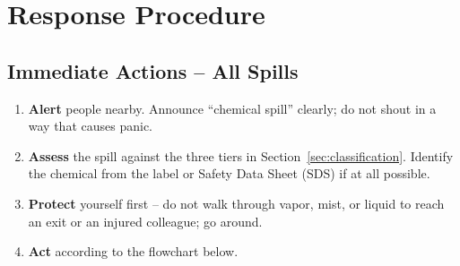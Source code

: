 
\section{Response Procedure}
\label{sec:response}

\subsection*{Immediate Actions -- All Spills}
\begin{enumerate}
  \item \textbf{Alert} people nearby. Announce ``chemical spill'' clearly; do not shout in a way
        that causes panic.
  \item \textbf{Assess} the spill against the three tiers in Section~\ref{sec:classification}.
        Identify the chemical from the label or Safety Data Sheet (SDS) if at all possible.
  \item \textbf{Protect} yourself first -- do not walk through vapor, mist, or liquid to reach an
        exit or an injured colleague; go around.
  \item \textbf{Act} according to the flowchart below.
\end{enumerate}

